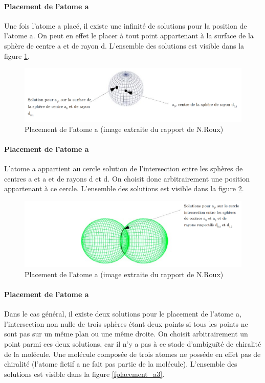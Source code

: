 \paragraph{Placement de l'atome a} Une fois l'atome a placé, il existe une infinité de solutions pour la position de l'atome a. On peut en effet le placer à tout point appartenant à la surface de la sphère de centre a et de rayon d. L'ensemble des solutions est visible dans la figure \ref{fplacement_a1}.

\begin{figure}
	\centering
	\includegraphics[scale=0.27]{images/1_sphere.png}
	\caption{Placement de l'atome a (image extraite du rapport de N.Roux)}
	\label{fplacement_a1}
\end{figure}

\paragraph{Placement de l'atome a} L'atome a appartient au cercle solution de l'intersection entre les sphères de centres a et a et de rayons d et d. On choisit donc arbitrairement une position appartenant à ce cercle. L'ensemble des solutions est visible dans la figure \ref{fplacement_a2}.

\begin{figure}
	\centering
	\includegraphics[scale=0.3]{images/2_spheres.png}
	\caption{Placement de l'atome a (image extraite du rapport de N.Roux)}
	\label{fplacement_a2}
\end{figure}


\paragraph{Placement de l'atome a} Dans le cas général, il existe deux solutions pour le placement de l'atome a, l'intersection non nulle de trois sphères étant deux points si tous les points ne sont pas sur un même plan ou une même droite. On choisit arbitrairement un point parmi ces deux solutions, car il n'y a pas à ce stade d'ambiguïté de chiralité de la molécule. Une molécule composée de trois atomes ne posséde en effet pas de chiralité (l'atome fictif a ne fait pas partie de la molécule).  L'ensemble des solutions est visible dans la figure \ref{fplacement_a3}.


